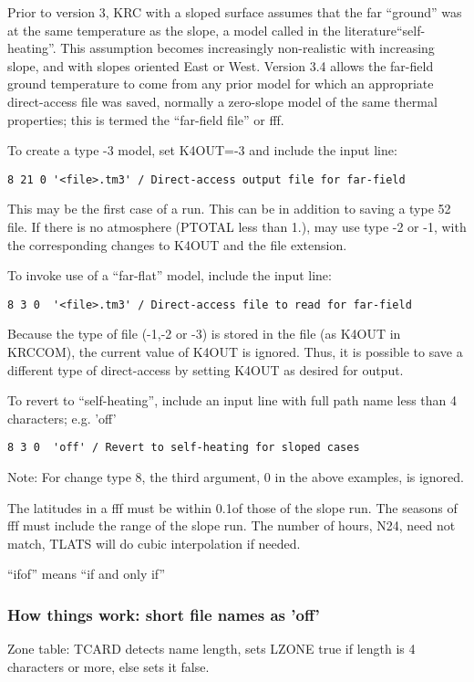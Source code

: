 

Prior to version 3, KRC with a sloped surface assumes that the far ``ground''
was at the same temperature as the slope, a model called in the
literature``self-heating''. This assumption becomes increasingly non-realistic
with increasing slope, and with slopes oriented East or West. Version 3.4 allows
the far-field ground temperature to come from any prior model for which an
appropriate direct-access file was saved, normally a zero-slope model of the
same thermal properties; this is termed the ``far-field file'' or fff.

To create a type -3 model, set K4OUT=-3 and include the input line:
\vspace{-3.mm}
\begin{verbatim}
8 21 0 '<file>.tm3' / Direct-access output file for far-field
\end{verbatim}
This may be the first case of a run. This can be in addition to saving a type 52
file. If there is no atmosphere (PTOTAL less than 1.), may use type -2 or -1,
with the corresponding changes to K4OUT and the file extension.

To invoke use of a ``far-flat'' model, include the input line:
\vspace{-3.mm}
\begin{verbatim}
8 3 0  '<file>.tm3' / Direct-access file to read for far-field
\end{verbatim}
Because the type of file (-1,-2 or -3) is stored in the file (as K4OUT in
KRCCOM), the current value of K4OUT is ignored. Thus, it is possible to save a
different type of direct-access by setting K4OUT as desired for output.


To revert to ``self-heating'', include an input line with full path name less than 4 characters; e.g. 'off'
\vspace{-3.mm}
\begin{verbatim}
8 3 0  'off' / Revert to self-heating for sloped cases
\end{verbatim}

Note: For change type 8, the third argument, 0 in the above examples, is ignored.

The latitudes in a fff must be within 0.1\qd of those of the slope run. The
seasons of fff must include the range of the slope run. The number of hours,
N24, need not match, TLATS will do cubic interpolation if needed.

``ifof'' means ``if and only if''

\subsubsection{How things work:  short file names as 'off'}
Zone table: TCARD detects name length, sets LZONE true if length is 4 characters or more, else sets it false.

